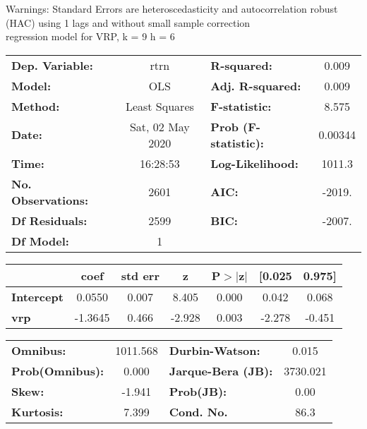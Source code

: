 Warnings: \newline
 [1] Standard Errors are heteroscedasticity and autocorrelation robust (HAC) using 1 lags and without small sample correction\\ 

regression model for VRP, k = 9 h = 6\begin{center}
\begin{tabular}{lclc}
\toprule
\textbf{Dep. Variable:}    &       rtrn       & \textbf{  R-squared:         } &     0.009   \\
\textbf{Model:}            &       OLS        & \textbf{  Adj. R-squared:    } &     0.009   \\
\textbf{Method:}           &  Least Squares   & \textbf{  F-statistic:       } &     8.575   \\
\textbf{Date:}             & Sat, 02 May 2020 & \textbf{  Prob (F-statistic):} &  0.00344    \\
\textbf{Time:}             &     16:28:53     & \textbf{  Log-Likelihood:    } &    1011.3   \\
\textbf{No. Observations:} &        2601      & \textbf{  AIC:               } &    -2019.   \\
\textbf{Df Residuals:}     &        2599      & \textbf{  BIC:               } &    -2007.   \\
\textbf{Df Model:}         &           1      & \textbf{                     } &             \\
\bottomrule
\end{tabular}
\begin{tabular}{lcccccc}
                   & \textbf{coef} & \textbf{std err} & \textbf{z} & \textbf{P$> |$z$|$} & \textbf{[0.025} & \textbf{0.975]}  \\
\midrule
\textbf{Intercept} &       0.0550  &        0.007     &     8.405  &         0.000        &        0.042    &        0.068     \\
\textbf{vrp}       &      -1.3645  &        0.466     &    -2.928  &         0.003        &       -2.278    &       -0.451     \\
\bottomrule
\end{tabular}
\begin{tabular}{lclc}
\textbf{Omnibus:}       & 1011.568 & \textbf{  Durbin-Watson:     } &    0.015  \\
\textbf{Prob(Omnibus):} &   0.000  & \textbf{  Jarque-Bera (JB):  } & 3730.021  \\
\textbf{Skew:}          &  -1.941  & \textbf{  Prob(JB):          } &     0.00  \\
\textbf{Kurtosis:}      &   7.399  & \textbf{  Cond. No.          } &     86.3  \\
\bottomrule
\end{tabular}
\end{center}

